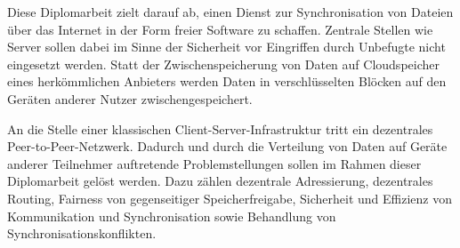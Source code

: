 Diese Diplomarbeit zielt darauf ab, einen Dienst zur Synchronisation von Dateien
über das Internet in der Form freier Software zu schaffen.
Zentrale Stellen wie Server sollen dabei im Sinne der Sicherheit vor Eingriffen
durch Unbefugte nicht eingesetzt werden.
Statt der Zwischenspeicherung von Daten auf Cloudspeicher eines herkömmlichen
Anbieters werden Daten in verschlüsselten Blöcken auf den Geräten anderer Nutzer
zwischengespeichert.

An die Stelle einer klassischen Client-Server-Infrastruktur tritt ein
dezentrales Peer-to-Peer-Netzwerk.
Dadurch und durch die Verteilung von Daten auf Geräte anderer Teilnehmer
auftretende Problemstellungen sollen im Rahmen dieser Diplomarbeit gelöst
werden.
Dazu zählen dezentrale Adressierung, dezentrales Routing, Fairness von
gegenseitiger Speicherfreigabe, Sicherheit und Effizienz von Kommunikation und
Synchronisation sowie Behandlung von Synchronisationskonflikten.
